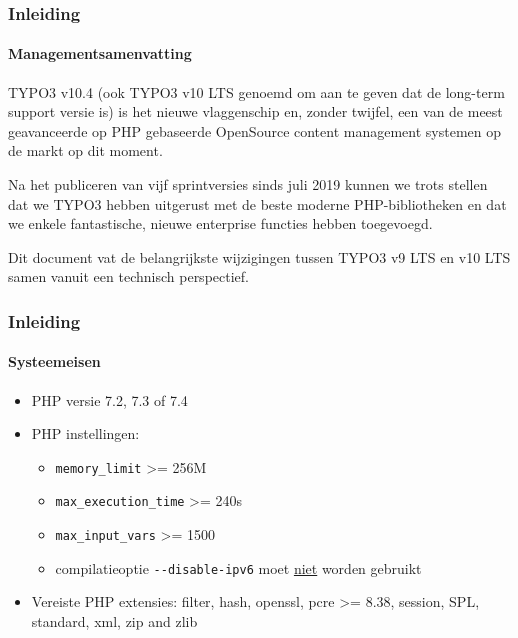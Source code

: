 \begin{frame}[fragile]
	\frametitle{Inleiding}
	\framesubtitle{Managementsamenvatting}

	\small
		TYPO3 v10.4 (ook TYPO3 v10 LTS genoemd om aan te geven dat de long-term support versie is)
		is het nieuwe vlaggenschip en, zonder twijfel, een van de meest geavanceerde op PHP gebaseerde OpenSource
		content management systemen op de markt op dit moment.

		\vspace{0.2cm}

		Na het publiceren van vijf sprintversies sinds juli 2019 kunnen we trots stellen dat we
		TYPO3 hebben uitgerust met de beste moderne PHP-bibliotheken en dat we enkele fantastische,
		nieuwe enterprise functies hebben toegevoegd.

		\vspace{0.2cm}

		Dit document vat de belangrijkste wijzigingen tussen TYPO3 v9 LTS en v10 LTS samen vanuit
		een technisch perspectief.

%


	\normalsize

\end{frame}


\begin{frame}[fragile]
	\frametitle{Inleiding}
	\framesubtitle{Systeemeisen}

	\begin{itemize}
		\item PHP versie 7.2, 7.3 of 7.4
		\item PHP instellingen:

			\begin{itemize}
				\item \texttt{memory\_limit} >= 256M
				\item \texttt{max\_execution\_time} >= 240s
				\item \texttt{max\_input\_vars} >= 1500
				\item compilatieoptie \texttt{-}\texttt{-disable-ipv6} moet \underline{niet} worden gebruikt
			\end{itemize}

			\item Vereiste PHP extensies:\newline
				\small
					filter, hash, openssl, pcre >= 8.38, session, SPL, standard,
					xml, zip and zlib
				\normalsize

		\end{itemize}

\end{frame}

